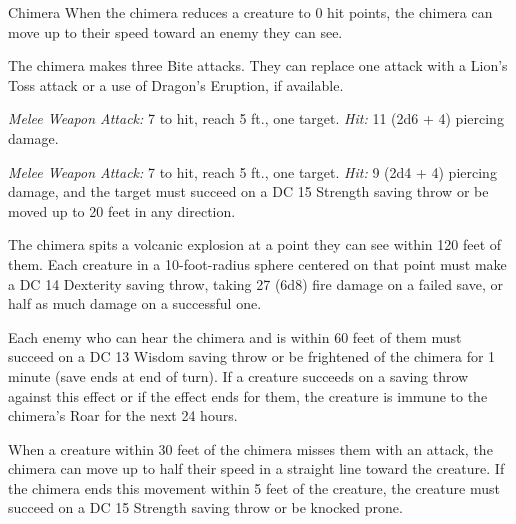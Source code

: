 \documentclass[10pt,a4paper,twoside,bg=print,twocolumn,openany,nodeprecatedcode]{dndbook}
\begin{document}
\begin{DndMonster}[float=t]{Chimera}
\DndMonsterBasics[
armor-class = {15 (natural armor)},
hit-points = {\DndDice{14d10 + 42}},
speed = {30 ft., fly 60 ft.}
]
\DndMonsterAbilityScores[
 str = 18,
 dex = 14,
 con = 16,
 int = 3,
 wis = 14,
 cha = 11
]
\DndMonsterDetails[
skills = {Athletics +7, Perception +5},
condition-immunities = {frightened},
senses = {darkvision 60 ft., passive perception 15},
languages = {understands any one language but can't speak},
challenge = 6,
]
When the chimera reduces a creature to 0 hit points, the chimera can move up to their speed toward an enemy they can see.

The chimera makes three Bite attacks. They can replace one attack with a Lion's Toss attack or a use of Dragon's Eruption, if available.

\textsl{Melee Weapon Attack:} 7 to hit, reach 5 ft., one target. \textsl{Hit:} 11 (2d6 + 4) piercing damage.

\textsl{Melee Weapon Attack:} 7 to hit, reach 5 ft., one target. \textsl{Hit:} 9 (2d4 + 4) piercing damage, and the target must succeed on a DC 15 Strength saving throw or be moved up to 20 feet in any direction.

The chimera spits a volcanic explosion at a point they can see within 120 feet of them. Each creature in a 10-foot-radius sphere centered on that point must make a DC 14 Dexterity saving throw, taking 27 (6d8) fire damage on a failed save, or half as much damage on a successful one.

Each enemy who can hear the chimera and is within 60 feet of them must succeed on a DC 13 Wisdom saving throw or be frightened of the chimera for 1 minute (save ends at end of turn). If a creature succeeds on a saving throw against this effect or if the effect ends for them, the creature is immune to the chimera's Roar for the next 24 hours.

When a creature within 30 feet of the chimera misses them with an attack, the chimera can move up to half their speed in a straight line toward the creature. If the chimera ends this movement within 5 feet of the creature, the creature must succeed on a DC 15 Strength saving throw or be knocked prone.

\end{DndMonster}
\end{document}
